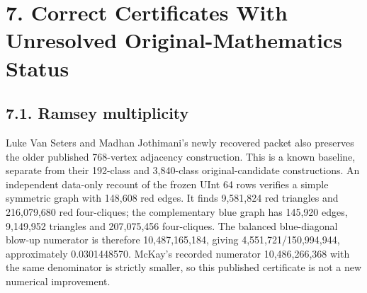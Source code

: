 \documentclass[11pt,a4paper]{article}
\begin{document}
\section{7. Correct Certificates With Unresolved Original-Mathematics Status}
\subsection{7.1. Ramsey multiplicity}
Luke Van Seters and Madhan Jothimani's newly recovered packet also preserves the older published 768-vertex adjacency construction. This is a known baseline, separate from their 192-class and 3,840-class original-candidate constructions. An independent data-only recount of the frozen UInt 64 rows verifies a simple symmetric graph with 148,608 red edges. It finds 9,581,824 red triangles and 216,079,680 red four-cliques; the complementary blue graph has 145,920 edges, 9,149,952 triangles and 207,075,456 four-cliques. The balanced blue-diagonal blow-up numerator is therefore 10,487,165,184, giving 4,551,721/150,994,944, approximately 0.0301448570. McKay's recorded numerator 10,486,266,368 with the same denominator is strictly smaller, so this published certificate is not a new numerical improvement.
\end{document}

